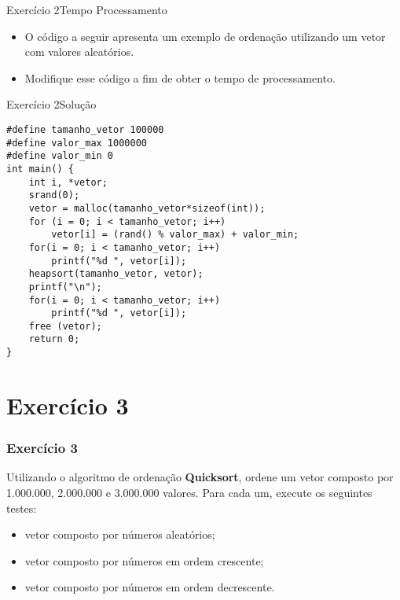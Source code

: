 \documentclass[aspectratio=169]{beamer}
\begin{document}

\begin{frame}[fragile]{Exercício 2}{Tempo Processamento}
\begin{itemize}
\item O código a seguir apresenta um exemplo de ordenação utilizando um vetor com valores aleatórios. 
\item Modifique esse código a fim de obter o tempo de processamento.
\end{itemize}
\end{frame}



\begin{frame}[fragile]{Exercício 2}{Solução}
\begin{lstlisting}[style=CStyle]
#define tamanho_vetor 100000
#define valor_max 1000000
#define valor_min 0
int main() {
    int i, *vetor;
    srand(0);
    vetor = malloc(tamanho_vetor*sizeof(int));
    for (i = 0; i < tamanho_vetor; i++)
        vetor[i] = (rand() % valor_max) + valor_min;
    for(i = 0; i < tamanho_vetor; i++)
        printf("%d ", vetor[i]);
    heapsort(tamanho_vetor, vetor);
    printf("\n");
    for(i = 0; i < tamanho_vetor; i++)
        printf("%d ", vetor[i]);
    free (vetor);
    return 0;
}
\end{lstlisting}  
\end{frame}


\section{Exercício 3}

\begin{frame}
\frametitle{Exercício 3}
Utilizando o algoritmo de ordenação {\bf Quicksort}, ordene um vetor composto por 1.000.000, 2.000.000 e 3.000.000 valores. Para cada um, execute os seguintes testes:
\begin{itemize}
 \item vetor composto por números aleatórios;
 \item vetor composto por números em ordem crescente;
 \item vetor composto por números em ordem decrescente.
\end{itemize} 
\end{frame}
\end{document}
